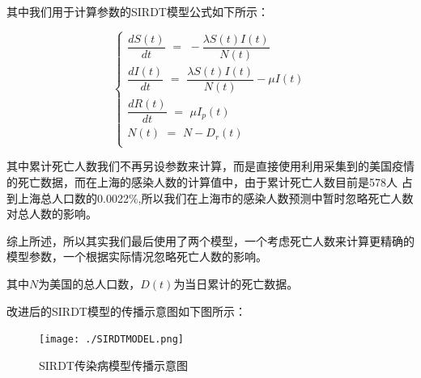 \documentclass[bwprint]{gmcmthesis}
\numberwithin{figure}{section}
\begin{document}
\par 其中我们用于计算参数的SIRDT模型公式如下所示：

\begin{equation} \label{}
    \begin{cases}
        \dfrac{dS\left( t \right)}{dt}\,\,=\,\,-\dfrac{\lambda S\left( t \right) I\left( t \right)}{N\left( t \right)}\\
        \dfrac{dI\left( t \right)}{dt}\,\,=\,\,\dfrac{\lambda S\left( t \right) I\left( t \right)}{N\left( t \right)}-\mu I\left( t \right)\\
        \dfrac{dR\left( t \right)}{dt}\,\,=\,\,\mu I_p\left( t \right)\\
        N\left( t \right) \,\,=\,\,N-D_r\left( t \right)\\
    \end{cases}
\end{equation}

\par 其中累计死亡人数我们不再另设参数来计算，而是直接使用利用采集到的美国疫情的死亡数据，而在上海的感染人数的计算值中，由于累计死亡人数目前是578人
占到上海总人口数的0.0022$\%$,所以我们在上海市的感染人数预测中暂时忽略死亡人数对总人数的影响。

\par 综上所述，所以其实我们最后使用了两个模型，一个考虑死亡人数来计算更精确的模型参数，一个根据实际情况忽略死亡人数的影响。

\par 其中$N$为美国的总人口数，$D\left( t \right)$为当日累计的死亡数据。

\par 改进后的SIRDT模型的传播示意图如下图所示：

\begin{figure}[!h]
    \centering
    \texttt{[image: ./SIRDTMODEL.png]}
    \caption{SIRDT传染病模型传播示意图}
    \label{fig1}
\end{figure}
\end{document}

